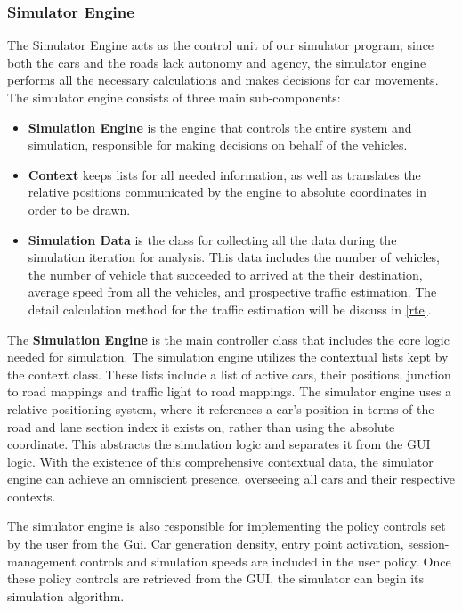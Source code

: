 \documentclass[11pt]{article}
\begin{document}
{\begin{itemize}
\subsubsection{Simulator Engine}

The Simulator Engine acts as the control unit of our simulator program; since both the cars and the roads lack autonomy and agency, the simulator engine performs all the necessary calculations and makes decisions for car movements. The simulator engine consists of three main sub-components:
\begin{itemize}

\item \textbf{Simulation Engine} is the engine that controls the entire system and simulation, responsible for making decisions on behalf of the vehicles.
\item \textbf{Context} keeps lists for all needed information, as well as translates the relative positions communicated by the engine to absolute coordinates in order to be drawn.
\item \textbf{Simulation  Data} is the class for collecting all the data during the simulation iteration for analysis. This data includes the number of vehicles, the number of vehicle that succeeded to arrived at the their destination, average speed from all the vehicles, and prospective traffic estimation. The detail calculation method for the traffic estimation will be discuss in \ref{rte}.

\end{itemize}
        
        
The \textbf{Simulation Engine } is the main controller class that includes the core logic needed for simulation. The simulation engine utilizes the contextual lists kept by the context class. These lists include a list of active cars, their positions, junction to road mappings and traffic light to road mappings. The simulator engine uses a relative positioning system, where it references a car's position in terms of the road and lane section index it exists on, rather than using the absolute coordinate. This abstracts the simulation logic and separates it from the GUI logic. With the existence of this comprehensive contextual data, the simulator engine can achieve an omniscient presence, overseeing all cars and their respective contexts. 

The simulator engine is also responsible for implementing the policy controls set by the user from the Gui. Car generation density, entry point activation, session-management controls and simulation speeds are included in the user policy. Once these policy controls are retrieved from the GUI, the simulator can begin its simulation algorithm.


\end{itemize}}
\end{document}
